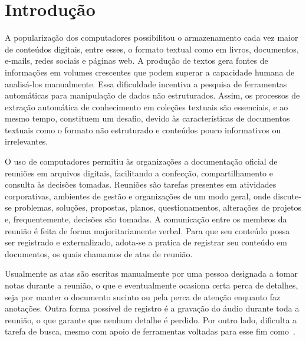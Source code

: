\chapter{Introdução}\label{chap:introducao}



A popularização dos computadores possibilitou o armazenamento cada vez maior de conteúdos digitais, entre esses, o formato textual como em livros, documentos, e-mails, redes sociais e páginas web. A produção de textos gera fontes de informações em volumes crescentes que podem superar a capacidade humana de analisá-los manualmente. Essa dificuldade incentiva a pesquisa de ferramentas automáticas para manipulação de dados não estruturados. Assim, os processos de extração automática de conhecimento em coleções textuais são essenciais, e ao mesmo tempo, constituem um desafio, devido às características de documentos textuais como o formato não estruturado e conteúdos pouco informativos ou irrelevantes.




O uso de computadores permitiu às organizações a documentação oficial de reuniões em arquivos digitais, facilitando a confecção, compartilhamento e consulta às decisões tomadas.
% 
% 
% 
% 
Reuniões são tarefas presentes em atividades corporativas, ambientes de gestão e organizações de um modo geral, onde discute-se problemas, soluções, propostas, planos, questionamentos, alterações de projetos e, frequentemente, decisões são tomadas. A comunicação entre os membros da reunião é feita de forma majoritariamente verbal. Para que seu conteúdo possa ser registrado e externalizado, adota-se a pratica de registrar seu conteúdo em documentos, os quais chamamos de atas de reunião. 

Usualmente as atas são escritas manualmente por uma pessoa designada a tomar notas durante a reunião, o que e eventualmente ocasiona certa perca de detalhes, seja por manter o documento sucinto ou pela perca de atenção enquanto faz anotações.  Outra forma possível de registro é a gravação do áudio durante toda a reunião, o que garante que nenhum detalhe é perdido. Por outro lado, dificulta a tarefa de busca, mesmo com apoio de ferramentas voltadas para esse fim como~\cite{Schiller2009}. 



